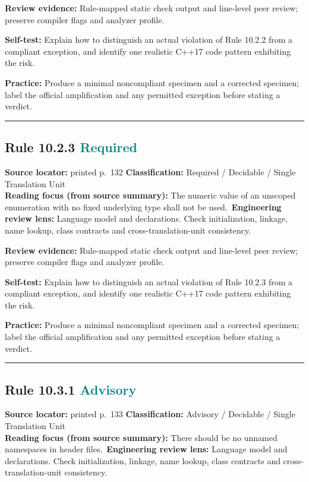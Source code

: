 \documentclass[10pt,letterpaper]{article}
\begin{document}
\textbf{Review evidence:} Rule-mapped static check output and line-level peer review; preserve compiler flags and analyzer profile.

\textbf{Self-test:} Explain how to distinguish an actual violation of Rule 10.2.2 from a compliant exception, and identify one realistic C++17 code pattern exhibiting the risk.\par
\textbf{Practice:} Produce a minimal noncompliant specimen and a corrected specimen; label the official amplification and any permitted exception before stating a verdict.
\smallskip\hrule\smallskip
\subsection*{Rule 10.2.3 \enspace \texorpdfstring{\small\textcolor{teal}{Required}}{Required}}
\noindent\textbf{Source locator:} printed p.~132 \quad\textbf{Classification:} Required / Decidable / Single Translation Unit\\
\textbf{Reading focus (from source summary):} The numeric value of an unscoped enumeration with no fixed underlying type shall not be used.\
\textbf{Engineering review lens:} Language model and declarations. Check initialization, linkage, name lookup, class contracts and cross-translation-unit consistency.

\textbf{Review evidence:} Rule-mapped static check output and line-level peer review; preserve compiler flags and analyzer profile.

\textbf{Self-test:} Explain how to distinguish an actual violation of Rule 10.2.3 from a compliant exception, and identify one realistic C++17 code pattern exhibiting the risk.\par
\textbf{Practice:} Produce a minimal noncompliant specimen and a corrected specimen; label the official amplification and any permitted exception before stating a verdict.
\smallskip\hrule\smallskip
\subsection*{Rule 10.3.1 \enspace \texorpdfstring{\small\textcolor{teal}{Advisory}}{Advisory}}
\noindent\textbf{Source locator:} printed p.~133 \quad\textbf{Classification:} Advisory / Decidable / Single Translation Unit\\
\textbf{Reading focus (from source summary):} There should be no unnamed namespaces in header files.\
\textbf{Engineering review lens:} Language model and declarations. Check initialization, linkage, name lookup, class contracts and cross-translation-unit consistency.
\end{document}
